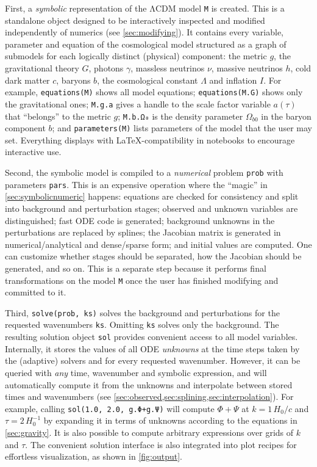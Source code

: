 \documentclass{aa}
\newcommand{\LCDM}{$\mathrm{\Lambda C D M}$}
\begin{document}
First, a \textit{symbolic} representation of the \LCDM{} model \texttt{M} is created.
This is a standalone object designed to be interactively inspected and modified independently of numerics (see \cref{sec:modifying}).
It contains every variable, parameter and equation of the cosmological model structured as a graph of submodels for each logically distinct (physical) component: the metric $g$, the gravitational theory $G$, photons $\gamma$, massless neutrinos $\nu$, massive neutrinos $h$, cold dark matter $c$, baryons $b$, the cosmological constant $\Lambda$ and inflation $I$.
For example, \texttt{equations(M)} shows all model equations; \texttt{equations(M.G)} shows only the gravitational ones; \texttt{M.g.a} gives a handle to the scale factor variable $a(\tau)$ that \enquote{belongs} to the metric $g$; \texttt{M.b.Ω₀} is the density parameter $\Omega_{b0}$ in the baryon component $b$; and \texttt{parameters(M)} lists parameters of the model that the user may set.
Everything displays with \LaTeX-compatibility in notebooks to encourage interactive use.

Second, the symbolic model is compiled to a \emph{numerical} problem \texttt{prob} with parameters \texttt{pars}.
This is an expensive operation where the \enquote{magic} in \cref{sec:symbolicnumeric} happens: equations are checked for consistency and split into background and perturbation stages; observed and unknown variables are distinguished; fast ODE code is generated; background unknowns in the perturbations are replaced by splines; the Jacobian matrix is generated in numerical/analytical and dense/sparse form; and initial values are computed.
One can customize whether stages should be separated, how the Jacobian should be generated, and so on.
This is a separate step because it performs final transformations on the model \texttt{M} once the user has finished modifying and committed to it.

Third, \texttt{solve(prob, ks)} solves the background and perturbations for the requested wavenumbers \texttt{ks}.
Omitting \texttt{ks} solves only the background.
The resulting solution object \texttt{sol} provides convenient access to all model variables.
Internally, it stores the values of all ODE \textit{unknowns} at the time steps taken by the (adaptive) solvers and for every requested wavenumber.
However, it can be queried with \textit{any} time, wavenumber and symbolic expression, and will automatically compute it from the unknowns and interpolate between stored times and wavenumbers (see \cref{sec:observed,sec:splining,sec:interpolation}).
For example, calling \texttt{sol(1.0, 2.0, g.Φ+g.Ψ)} will compute $\Phi+\Psi$ at $k = 1 \, H_0/c$ and $\tau = 2 \, H_0^{-1}$ by expanding it in terms of unknowns according to the equations in \cref{sec:gravity}.
It is also possible to compute arbitrary expressions over grids of $k$ and $\tau$.
The convenient solution interface is also integrated into plot recipes for effortless visualization, as shown in \cref{fig:output}.
\end{document}
